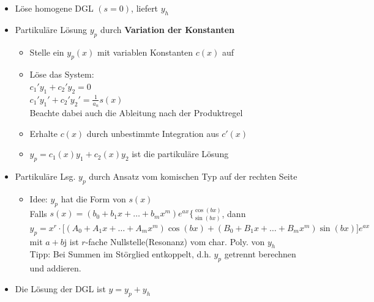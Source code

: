\documentclass[6pt,a4paper]{scrartcl}
\renewcommand{\emph}[1]{\textbf{#1}}
\renewcommand{\i}{\ensuremath{\mathrm{j}}}										%
\begin{document}
\begin{multicols}{4}
	\begin{itemize}[itemsep=0pt, leftmargin=8pt]
	\item Löse homogene DGL $(s = 0)$, liefert $y_h$
	\item Partikuläre Lösung $y_p$ durch \emph{Variation der Konstanten}
		\begin{itemize}[itemsep=0pt, leftmargin=8pt]
		\item Stelle ein $y_p (x)$ mit variablen Konstanten $c(x)$ auf
		\item Löse das System: \\
		$c_1' y_1 + c_2' y_2 = 0$ \\
		$c_1' y_1' + c_2' y_2' = \frac{1}{a_n} s(x)$ \\
		Beachte dabei auch die Ableitung nach der Produktregel
		\item Erhalte $c(x)$ durch unbestimmte Integration aus $c'(x)$
		\item $y_p = c_1 (x) y_1 + c_2 (x) y_2$ ist die partikuläre Lösung
	 	\end{itemize}
	\item Partikuläre Lsg. $y_p$ durch Ansatz vom komischen Typ auf der rechten Seite
		\begin{itemize}[itemsep=0pt, leftmargin=8pt]
		\item Idee: $y_p$ hat die Form von $s(x)$\\
		Falls $s(x) = (b_0 + b_1 x + \ldots + b_m x^m) e^{ax}  \Big\{ {}^{\textstyle \cos(bx)} _{\textstyle \sin(bx)}$, dann\\
		$y_p = x^r \cdot \big[ (A_0 + A_1 x + \ldots + A_m x^m) \cos(bx) + (B_0 + B_1 x + \ldots + B_m x^m) \sin(bx) \big] e^{ax}$ \\
		mit $a+b\i$ ist $r$-fache Nullstelle(Resonanz) vom char. Poly. von $y_h$ \\
		Tipp: Bei Summen im Störglied entkoppelt, d.h. $y_p$ getrennt berechnen und addieren.
		\end{itemize}
	\item Die Lösung der DGL ist $y = y_p + y_h$
	\end{itemize}	


\end{multicols}
\end{document}
